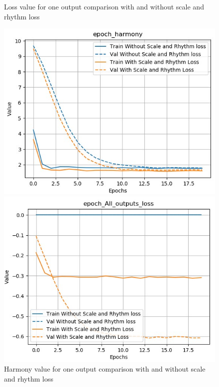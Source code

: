 \documentclass[12pt]{report}
\begin{document}
\begin{figure}[htbp]
\begin{minipage}{0.5 \textwidth}
\begin{center}
            \caption{Loss value for one output comparison with and without scale and rhythm loss}
            \label{fig:exp:scale-rhythm:kld-comparison}
        \end{center}
    \end{minipage}
\end{figure}

\begin{figure}[htbp]
    \begin{minipage}{0.5\textwidth}
        \begin{center}
            \includegraphics[width=\textwidth]{images/experiences/scale-rhythm-rnn/harmony-comparison-scale-rhythm.jpg}
            \caption{Harmony value for one output comparison with and without scale and rhythm loss}
            \label{fig:exp:scale-rhythm:harmony-comparison}
        \end{center}
    \end{minipage} \hfill
    \begin{minipage}{0.5 \textwidth}
        \begin{center}
            \includegraphics[width=\textwidth]{images/experiences/scale-rhythm-rnn/loss-all-comparison-scale-rhythm.jpg}

\end{center}
\end{minipage}
\end{figure}
\end{document}
